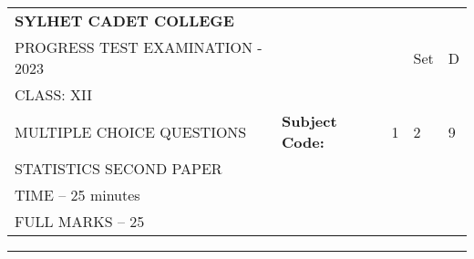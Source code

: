 \documentclass{exam}
\begin{document}
\begin{table}[h]
\centering
\begin{tabular}{lllll}
\textbf{\large SYLHET CADET COLLEGE} &  &  &  &  \\ \cline{4-5} 
PROGRESS TEST EXAMINATION - 2023 &  & \multicolumn{1}{l|}{} & \multicolumn{1}{l|}{Set} & \multicolumn{1}{l|}{D} \\ \cline{4-5} 
CLASS: XII &  &  &  &  \\ \cline{3-5} 
MULTIPLE CHOICE QUESTIONS & \multicolumn{1}{l|}{\textbf{Subject Code:}} & \multicolumn{1}{l|}{1} & \multicolumn{1}{l|}{2} & \multicolumn{1}{l|}{9} \\ \cline{3-5} 
STATISTICS SECOND PAPER &  &  &  &  \\
TIME – 25 minutes &  &  &  &  \\
FULL MARKS – 25 &  &  &  & 
\end{tabular}
\end{table}
\hrule
\end{document}
